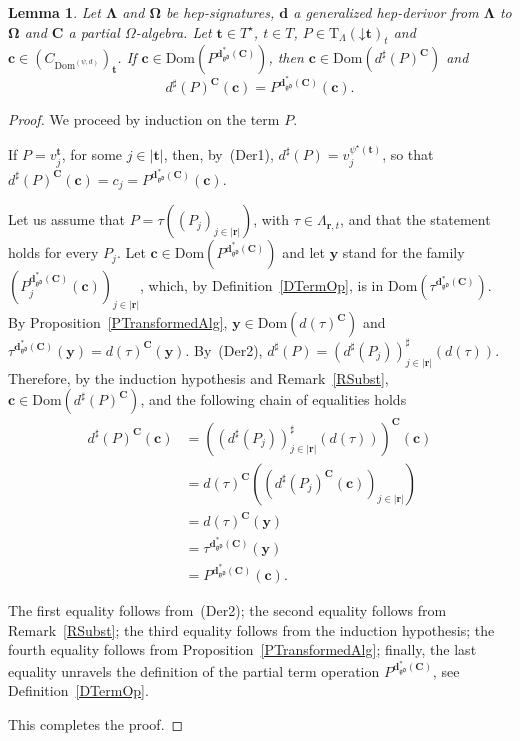 \documentclass[a4paper, reqno
]{amsart}
\newcommand{\bb}[1]{\ensuremath{\lvert #1 \rvert}}
\newcommand{\vs}[1]{\mathbin{\downarrow}#1}
\newcommand{\sig}[1]{\mathbf{#1}}             %
\newcommand{\Dom}{\mathrm{Dom}}
\newcommand{\gd}{\mathfrak{gd}}              %
\theoremstyle{plain}
\newtheorem{lemma}[theorem]{Lemma}
\theoremstyle{definition}
\begin{document}
\begin{lemma}\label{LTermComp}
Let $\sig{\Lambda}$ and $\sig{\Omega}$ be hep-signatures, $\mathbf{d}$ a generalized hep-derivor from $\sig{\Lambda}$ to $\sig{\Omega}$ and $\mathbf{C}$ a partial $\Omega$-algebra.
Let $\mathbf{t}\in T^{\star}$, $t\in T$, $P\in\mathrm{T}_{\Lambda}(\vs{\mathbf{t}})_{t}$ and $\mathbf{c}\in(C_{\Dom^{(\psi,d)}})_{\mathbf{t}}$.
If $\mathbf{c}\in\Dom(P^{\mathbf{d}^{\ast}_{\gd}(\mathbf{C})})$, then $\mathbf{c}\in\Dom(d^{\sharp}(P)^{\mathbf{C}})$ and
$$
d^{\sharp}(P)^{\mathbf{C}}(\mathbf{c})=P^{\mathbf{d}^{\ast}_{\gd}(\mathbf{C})}(\mathbf{c}).
$$
\end{lemma}
\begin{proof}
We proceed by induction on the term $P$.

If $P=v^{\mathbf{t}}_{j}$, for some $j\in\bb{\mathbf{t}}$, then, by~(Der1), $d^{\sharp}(P)=v^{\psi^{\star}(\mathbf{t})}_{j}$, so that $d^{\sharp}(P)^{\mathbf{C}}(\mathbf{c})=c_{j}=P^{\mathbf{d}^{\ast}_{\gd}(\mathbf{C})}(\mathbf{c})$.

Let us assume that $P=\tau((P_{j})_{j\in\bb{\mathbf{r}}})$, with $\tau\in\Lambda_{\mathbf{r},t}$, and that the statement holds for every $P_{j}$.
Let $\mathbf{c}\in\Dom(P^{\mathbf{d}^{\ast}_{\gd}(\mathbf{C})})$ and let $\mathbf{y}$ stand for the family $(P_{j}^{\mathbf{d}^{\ast}_{\gd}(\mathbf{C})}(\mathbf{c}))_{j\in\bb{\mathbf{r}}}$, which, by Definition~\ref{DTermOp}, is in $\Dom(\tau^{\mathbf{d}^{\ast}_{\gd}(\mathbf{C})})$.
By Proposition~\ref{PTransformedAlg}, $\mathbf{y}\in\Dom(d(\tau)^{\mathbf{C}})$ and $\tau^{\mathbf{d}^{\ast}_{\gd}(\mathbf{C})}(\mathbf{y})=d(\tau)^{\mathbf{C}}(\mathbf{y})$.
By~(Der2), $d^{\sharp}(P)=(d^{\sharp}(P_{j}))^{\sharp}_{j\in\bb{\mathbf{r}}}(d(\tau))$.
Therefore, by the induction hypothesis and Remark~\ref{RSubst}, $\mathbf{c}\in\Dom(d^{\sharp}(P)^{\mathbf{C}})$, and the following chain of equalities holds
\begin{align*}
d^{\sharp}(P)^{\mathbf{C}}\left(\mathbf{c}\right)
&=
\left(\left(d^{\sharp}(P_{j})\right)^{\sharp}_{j\in\bb{\mathbf{r}}}\left(d(\tau)\right)\right)^{\mathbf{C}}\left(\mathbf{c}\right)
\tag{1}
\\&=
d(\tau)^{\mathbf{C}}\left(\left(d^{\sharp}(P_{j})^{\mathbf{C}}(\mathbf{c})\right)_{j\in\bb{\mathbf{r}}}\right)
\tag{2}
\\&=
d(\tau)^{\mathbf{C}}\left(\mathbf{y}\right)
\tag{3}
\\&=
\tau^{\mathbf{d}^{\ast}_{\gd}(\mathbf{C})}\left(\mathbf{y}\right)
\tag{4}
\\&=
P^{\mathbf{d}^{\ast}_{\gd}(\mathbf{C})}\left(\mathbf{c}\right).
\tag{5}
\end{align*}

The first equality follows from~(Der2); the second equality follows from Remark~\ref{RSubst}; the third equality follows from the induction hypothesis; the fourth equality follows from Proposition~\ref{PTransformedAlg}; finally, the last equality unravels the definition of the partial term operation $P^{\mathbf{d}^{\ast}_{\gd}(\mathbf{C})}$, see Definition~\ref{DTermOp}.

This completes the proof.
\end{proof}
\end{document}
